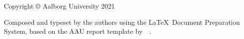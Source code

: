 \thispagestyle{empty}
{\small
\strut\vfill %
\noindent Copyright \copyright{} Aalborg University 2021\par
\vspace{0.2cm}
\noindent Composed and typeset by the authors using the \LaTeX\ Document Preparation System, based on the AAU report template by~\citeauthor{Drunge}~\cite{Drunge}.
}
\clearpage

